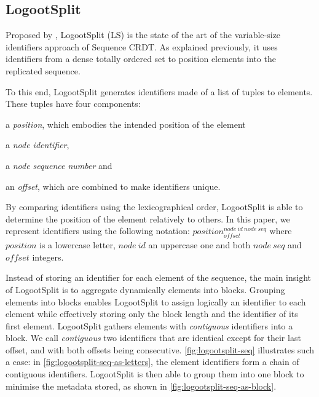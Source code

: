 \documentclass[sigplan,10pt,authorversion]{acmart}
\newcommand{\trm}[1]{\mathit{#1}}
\newcommand{\id}[3]{$\trm{#1}^{\trm{#2}}_{\trm{#3}}$}
\begin{document}
\subsection{LogootSplit}

Proposed by \citet{AndreCollaborateCom2013}, LogootSplit (LS) is the state of the art of the variable-size identifiers approach of Sequence \ac{CRDT}.
As explained previously, it uses identifiers from a dense totally ordered set to position elements into the replicated sequence.

To this end, LogootSplit generates identifiers made of a list of tuples to elements.
These tuples have four components:
\begin{enumerate*}
    \item a \emph{position}, which embodies the intended position of the element
    \item a \emph{node identifier},
    \item a \emph{node sequence number} and
    \item an \emph{offset}, which are combined to make identifiers unique.
\end{enumerate*}
By comparing identifiers using the lexicographical order, LogootSplit is able to determine the position of the element relatively to others.
In this paper, we represent identifiers using the following notation: \id{position}{node~id~node~seq}{offset} where $\trm{position}$ is a lowercase letter, $\trm{node~id}$ an uppercase one and both $\trm{node~seq}$ and $\trm{offset}$ integers.

Instead of storing an identifier for each element of the sequence, the main insight of LogootSplit is to aggregate dynamically elements into blocks.
Grouping elements into blocks enables LogootSplit to assign logically an identifier to each element while effectively storing only the block length and the identifier of its first element.
LogootSplit gathers elements with \emph{contiguous} identifiers into a block.
We call \emph{contiguous} two identifiers that are identical except for their last offset, and with both offsets being consecutive.
\autoref{fig:logootsplit-seq} illustrates such a case: in \autoref{fig:logootsplit-seq-as-letters}, the element identifiers form a chain of contiguous identifiers.
LogootSplit is then able to group them into one block to minimise the metadata stored, as shown in \autoref{fig:logootsplit-seq-as-block}.
\end{document}
